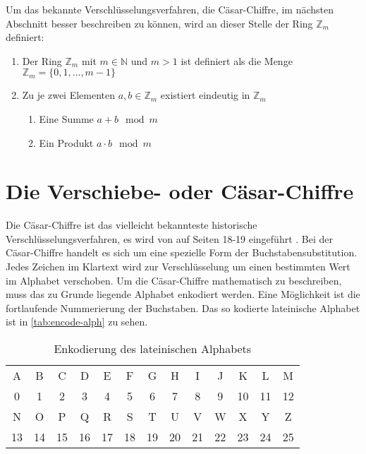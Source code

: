 \newpage
\noindent
Um das bekannte Verschlüsselungsverfahren, die Cäsar-Chiffre, im nächsten Abschnitt
besser beschreiben zu können, wird an dieser Stelle der Ring $\mathbb{Z}_m$ definiert:
\begin{definition}[Der Ring $\mathbb{Z}_m$ der Reste modulo $m$]
  \leavevmode
  \begin{enumerate}[itemsep = 0pt]
    \item Der Ring $\mathbb{Z}_m$ mit $m \in \mathbb{N}$ und $m > 1$ ist
          definiert als die Menge $\mathbb{Z}_m = \{0,1,\dots,m - 1\}$
    \item Zu je zwei Elementen $a,b \in \mathbb{Z}_m$ existiert eindeutig in $\mathbb{Z}_m$
          \begin{enumerate}[itemsep = 0pt, topsep=0pt]
            \item Eine Summe $a + b \mod{m}$
            \item Ein Produkt $a \cdot b \mod{m}$
          \end{enumerate}
  \end{enumerate}
\end{definition}

\section{Die Verschiebe- oder Cäsar-Chiffre}
Die Cäsar-Chiffre ist das vielleicht bekannteste historische Verschlüsselungsverfahren,
es wird von \citeauthor{BOOK:crypto} auf Seiten 18-19 eingeführt \parencite*{BOOK:crypto}.
Bei der Cäsar-Chiffre handelt es sich um eine spezielle Form der Buchstabensubstitution.
Jedes Zeichen im Klartext wird zur Verschlüsselung um einen bestimmten Wert
im Alphabet verschoben.
Um die Cäsar-Chiffre mathematisch zu
beschreiben, muss das zu Grunde liegende Alphabet enkodiert werden.
Eine Möglichkeit ist die fortlaufende Nummerierung der Buchstaben. Das so kodierte
lateinische Alphabet ist in \autoref{tab:encode-alph} zu sehen.

\begin{table}[h]
  \centering
  \caption{Enkodierung des lateinischen Alphabets}
  \begin{tabular}{|c|c|c|c|c|c|c|c|c|c|c|c|c|}
    \hline
    A  & B  & C  & D  & E  & F  & G  & H  & I  & J  & K  & L  & M  \\
    0  & 1  & 2  & 3  & 4  & 5  & 6  & 7  & 8  & 9  & 10 & 11 & 12 \\
    \hline
    N  & O  & P  & Q  & R  & S  & T  & U  & V  & W  & X  & Y  & Z  \\
    13 & 14 & 15 & 16 & 17 & 18 & 19 & 20 & 21 & 22 & 23 & 24 & 25 \\
    \hline
  \end{tabular}
  \label{tab:encode-alph}
\end{table}

